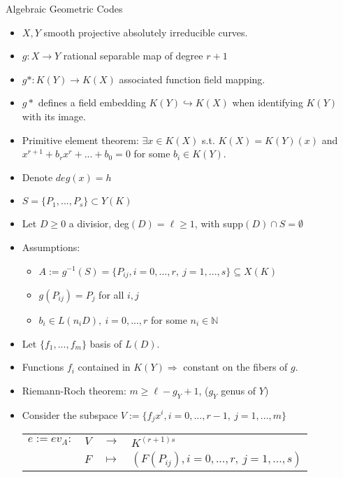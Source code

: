 \begin{frame}{Algebraic Geometric Codes}
\begin{itemize}
\item $X,Y$ smooth projective absolutely irreducible curves.

\item $g: X \rightarrow Y$ rational separable map of degree $r+1$

\item $g*: K(Y) \rightarrow K(X)$ associated function field mapping.

\item $g*$ defines a field embedding $K(Y) \hookrightarrow K(X)$ when identifying $K(Y)$ with its image.

\item Primitive element theorem: $\exists x \in K(X)$ s.t. $K(X) = K(Y)(x)$
and $x^{r+1} + b_r x^r + ... + b_0 = 0$ for some $b_i \in K(Y)$.

\item Denote $deg(x) = h$

\item $S = \{ P_1, ..., P_s \} \subset Y(K)$

\item Let $D \geq 0$ a divisior, deg$(D) = \ell \geq 1$, with supp$(D) \cap S = \emptyset$
\end{itemize}
\end{frame}

\begin{frame}
\begin{itemize}
\item Assumptions:
\begin{itemize}
\item $A := g^{-1}(S) = \{P_{ij}, i=0,...,r, \ j=1,...,s\} \subseteq X(K)$

\item $g(P_{ij}) = P_j$ for all $i,j$

\item $b_i \in L(n_i D), \ i=0,...,r$ for some $n_i \in \mathbb{N}$
\end{itemize}

\item Let $\{ f_1, ..., f_m \}$ basis of $L(D)$.

\item Functions $f_i$ contained in $K(Y) \Rightarrow$ constant on the fibers of $g$.

\item Riemann-Roch theorem: $m \geq \ell - g_Y +1$, ($g_Y$ genus of $Y$)

\item Consider the subspace $V:=\{f_j x^i, i=0,...,r-1, \ j=1,...,m\}$

\begin{tabular}{rccl}
$e := ev_A:$ & $V$ & $\rightarrow$ & $K^{(r+1)s}$ \\
            & $F$ & $\mapsto$ & $(F(P_{ij}), i=0,...,r, \ j=1,...,s)$
\end{tabular}

\end{itemize}
\end{frame}

